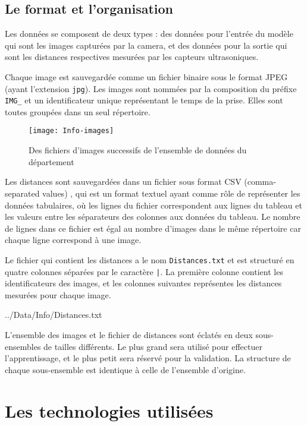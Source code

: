 \subsection{Le format et l'organisation}

Les données se composent de deux types : des données pour l'entrée du modèle
qui sont les images capturées par la camera, et des données pour la sortie
qui sont les distances respectives mesurées par les capteurs ultrasoniques.

Chaque image est sauvegardée comme un fichier binaire sous le format JPEG \cite{wallace1992jpeg}
(ayant l'extension \texttt{jpg}). Les images sont nommées par la composition du
préfixe \texttt{IMG\_} et un identificateur unique représentant le temps de la
prise. Elles sont toutes groupées dans un seul répertoire.

\begin{figure}[h]
  \centering
  \texttt{[image: Info-images]}
  \caption{Des fichiers d'images successifs de l'ensemble de données du département}
\end{figure}

Les distances sont sauvegardées dans un fichier sous format CSV (comma-separated
values) \cite{shafranovich2005common}, qui est un format textuel ayant comme rôle de représenter
les données tabulaires, où les lignes du fichier correspondent aux lignes du tableau
et les valeurs entre les séparateurs des colonnes aux données du tableau.
Le nombre de lignes dans ce fichier est égal au nombre d'images dans le
même répertoire car chaque ligne correspond à une image.

Le fichier qui contient les distances a le nom \texttt{Distances.txt} et est
structuré en quatre colonnes séparées par le caractère \texttt{|}. La première
colonne contient les identificateurs des images, et les colonnes suivantes
représentes les distances mesurées pour chaque image.

\bigskip


{../Data/Info/Distances.txt}

L'ensemble des images et le fichier de distances sont éclatés en deux sous-ensembles
de tailles différents. Le plus grand sera utilisé pour effectuer l'apprentissage,
et le plus petit sera réservé pour la validation. La structure de chaque
sous-ensemble est identique à celle de l'ensemble d'origine.

\section{Les technologies utilisées}

